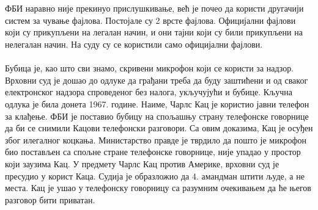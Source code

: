 \documentclass{article}
\begin{document}
\\\\
ФБИ наравно није прекинуо прислушкивање, већ је почео да користи другачији систем за чување фајлова. Постојале су 2 врсте фајлова. Официјални фајлови који су прикупљени на легалан начин, и они тајни који су били прикупљени на нелегалан начин. На суду су се користили само официјални фајлови.
\\\\
Бубица је, као што сви знамо, скривени микрофон који се користи за надзор. Врховни суд је дошао до одлуке да грађани треба да буду заштићени и од сваког електронског надзора спроведеног без налога, укључујући и бубице. Кључна одлука је била донета 1967. године. Наиме, Чарлс Кац је користио јавни телефон за клађење. ФБИ је поставио бубицу на спољашњу страну телефонске говорнице да би се снимили Кацови телефонски разговори. Са овим доказима, Кац је осуђен због илегалног коцкања. Министарство правде је тврдило да пошто је микрофон био постављен са спољне стране телефонске говорнице, није упадао у простор који заузима Кац. У предмету Чарлс Кац против Америке, врховни суд је пресудио у корист Каца. Судија је образложио да 4. амандман штити људе, а не места. Кац је ушао у телефонску говорницу са разумним очекивањем да ће његов разговор бити приватан.
 
\end{document}

